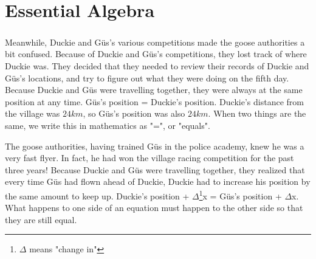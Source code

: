 \chapter{Essential Algebra}
\paragraph{} Meanwhile, Duckie and Güs's various competitions made the goose authorities a bit confused. Because of Duckie and Güs's competitions, they lost track of where Duckie was. They decided that they needed to review their records of Duckie and Güs's locations, and try to figure out what they were doing on the fifth day. 
\vfill
\pagebreak
{Because Duckie and Güs were travelling together, they were always at the same position at any time.}
{Güs's position = Duckie's position. Duckie's distance from the village was $24km$, so Güs's position was also $24km$.}
{When two things are the same, we write this in mathematics as "=", or "equals".}
{}
{The goose authorities, having trained Güs in the police academy, knew he was a very fast flyer. In fact, he had won the village racing competition for the past three years! Because Duckie and Güs were travelling together, they realized that every time Güs had flown ahead of Duckie, Duckie had to increase his position by the same amount to keep up.}
{Duckie's position + $\Delta$\footnote{$\Delta$ means "change in"}x = Güs's position + $\Delta$x.}
{What happens to one side of an equation must happen to the other side so that they are still equal.}
